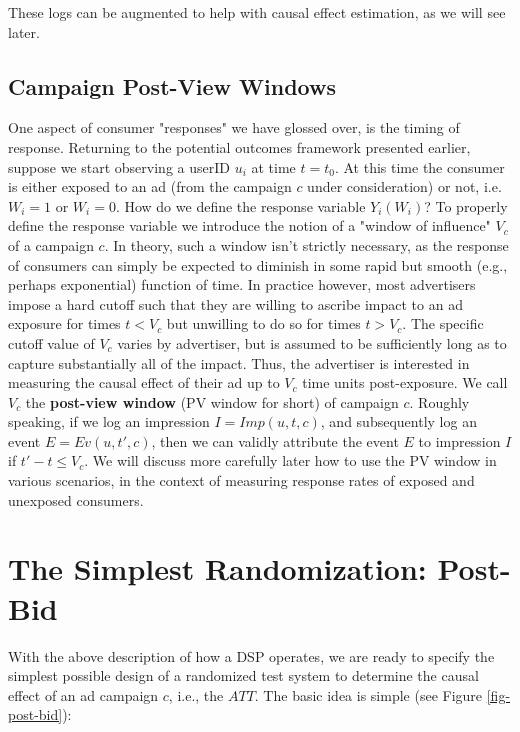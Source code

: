 \documentclass[11pt,a4paper]{article}
\theoremstyle{definition}
\theoremstyle{remark}
\theoremstyle{definition}
\theoremstyle{definition}
\theoremstyle{definition}
\theoremstyle{definition}
\theoremstyle{definition}
\theoremstyle{definition}
\begin{document}
These logs can be augmented to help with causal effect estimation, as we will see later.


\subsection{Campaign Post-View Windows}\label{sec-pv}

One aspect of consumer "responses" we have glossed over, is the timing of response. Returning to the potential outcomes framework presented earlier, suppose we start observing a userID $u_i$ at time $t = t_0$. At this time the consumer is either exposed to an ad (from the campaign $c$ under consideration) or not, i.e. $W_i = 1$ or $W_i=0$. How do we define the response variable $Y_i(W_i)$? To properly define the response variable we introduce the notion of a "window of influence" $V_c$ of a campaign $c$. In theory, such a window isn't strictly necessary, as the response of consumers can simply be expected to diminish in some rapid but smooth (e.g., perhaps exponential) function of time. In practice however, most advertisers impose a hard cutoff such that they are willing to ascribe impact to an ad exposure for times $t < V_c$ but unwilling to do so for times $t > V_c$. The specific cutoff value of $V_c$ varies by advertiser, but is assumed to be sufficiently long as to capture substantially all of the impact. Thus, the advertiser is interested in measuring the causal effect of their ad up to $V_c$ time units post-exposure. We call $V_c$ the {\bf post-view window} (PV window for short) of campaign $c$. Roughly speaking, if we log an impression $I = Imp(u,t,c)$, and subsequently log an event $E = Ev(u,t',c)$, then we can validly attribute the event $E$ to impression $I$ if $t' - t \leq V_c$. We will discuss more carefully later how to use the PV window in various scenarios, in the context of measuring response rates of exposed and unexposed consumers.


\section{The Simplest Randomization: Post-Bid} \label{sec-psa}

With the above description of how a DSP operates, we are ready to specify the simplest possible design of a randomized test system to determine the causal effect of an ad campaign $c$, i.e., the $ATT$. 
The basic idea is simple (see Figure \ref{fig-post-bid}):
\end{document}
